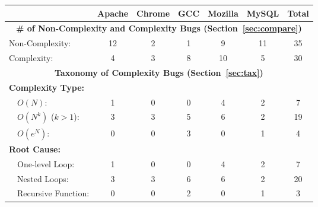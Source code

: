 
\begin{table}[tb!]
\begin{adjustwidth}{-.5in}{-.5in}
\centering
{
\scriptsize{
\begin{tabular}{|lcccccc|}
\hline
                                                                                  	&   Apache  &   Chrome   &  GCC   &    Mozilla   &   MySQL  &  Total\\
\hline
\multicolumn{7}{|c|}{\bf \# of Non-Complexity and Complexity Bugs (Section~\ref{sec:compare})} \\
\multicolumn{1}{|l}{Non-Complexity:}                                                   &   12      &    2       &   1    &    9         &  11      &   35 \\
\multicolumn{1}{|l}{Complexity:}                                                       &   4       &    3       &   8    &    10        &   5      &   30 \\
\hline \hline
\multicolumn{7}{|c|}{\bf Taxonomy of Complexity Bugs (Section~\ref{sec:tax})}\\
\hline
\multicolumn{7}{|l|}{\bf Complexity Type:} \\
\ \ {$O(N)$:}                              					&   1       &    0       &   0    &    4         &   2      &   7\\
\ \ {$O(N^k)$ ($k>1$):}                						&   3       &    3       &   5    &    6         &   2      &  19\\
\ \ {$O(e^N)$:}                       							&   0       &    0       &   3    &    0         &   1      &   4\\
\hline
\multicolumn{7}{|l|}{\bf Root Cause:} \\
\ \ {{One-level Loop:}}                 			&   1       &    0       &   0    &    4         &   2      &   7 \\
\ \ {{Nested Loops:}}                   			&   3       &    3       &   6    &    6         &   2      &   20 \\
\ \ {{Recursive Function:}}             			&   0       &    0       &   2    &    0         &   1      &   3 \\
\hline


\end{tabular}}}
\end{adjustwidth}
\end{table}
